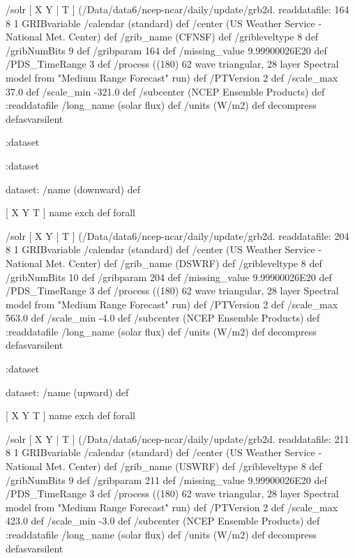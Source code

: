 \begin{ingrid}
    /solr { [ X Y | T ] (/Data/data6/ncep-ncar/daily/update/grb2d.%
    readdatafile:
    164 8 1 GRIBvariable
    /calendar (standard) def
    /center (US Weather Service - National Met. Center) def
    /grib_name (CFNSF) def
    /gribleveltype 8 def
    /gribNumBits 9 def
    /gribparam 164 def
    /missing_value 9.99900026E20 def
    /PDS_TimeRange 3 def
    /process ((180) 62 wave triangular, 28 layer Spectral model from "Medium Range Forecast" run) def
    /PTVersion 2 def
    /scale_max 37.0 def
    /scale_min -321.0 def
    /subcenter (NCEP Ensemble Products) def
    :readdatafile
    /long_name (solar flux) def
    /units (W/m2) def
    decompress
    } defasvarsilent

   :dataset

  :dataset

  dataset: /name (downward) def

   [ X Y T ] { name exch def } forall

   /solr { [ X Y | T ] (/Data/data6/ncep-ncar/daily/update/grb2d.%
   readdatafile:
   204 8 1 GRIBvariable
   /calendar (standard) def
   /center (US Weather Service - National Met. Center) def
   /grib_name (DSWRF) def
   /gribleveltype 8 def
   /gribNumBits 10 def
   /gribparam 204 def
   /missing_value 9.99900026E20 def
   /PDS_TimeRange 3 def
   /process ((180) 62 wave triangular, 28 layer Spectral model from "Medium Range Forecast" run) def
   /PTVersion 2 def
   /scale_max 563.0 def
   /scale_min -4.0 def
   /subcenter (NCEP Ensemble Products) def
   :readdatafile
   /long_name (solar flux) def
   /units (W/m2) def
   decompress
   } defasvarsilent

  :dataset

  dataset: /name (upward) def

   [ X Y T ] { name exch def } forall

   /solr { [ X Y | T ] (/Data/data6/ncep-ncar/daily/update/grb2d.%
   readdatafile:
   211 8 1 GRIBvariable
   /calendar (standard) def
   /center (US Weather Service - National Met. Center) def
   /grib_name (USWRF) def
   /gribleveltype 8 def
   /gribNumBits 9 def
   /gribparam 211 def
   /missing_value 9.99900026E20 def
   /PDS_TimeRange 3 def
   /process ((180) 62 wave triangular, 28 layer Spectral model from "Medium Range Forecast" run) def
   /PTVersion 2 def
   /scale_max 423.0 def
   /scale_min -3.0 def
   /subcenter (NCEP Ensemble Products) def
   :readdatafile
   /long_name (solar flux) def
   /units (W/m2) def
   decompress
   } defasvarsilent


\end{ingrid}
